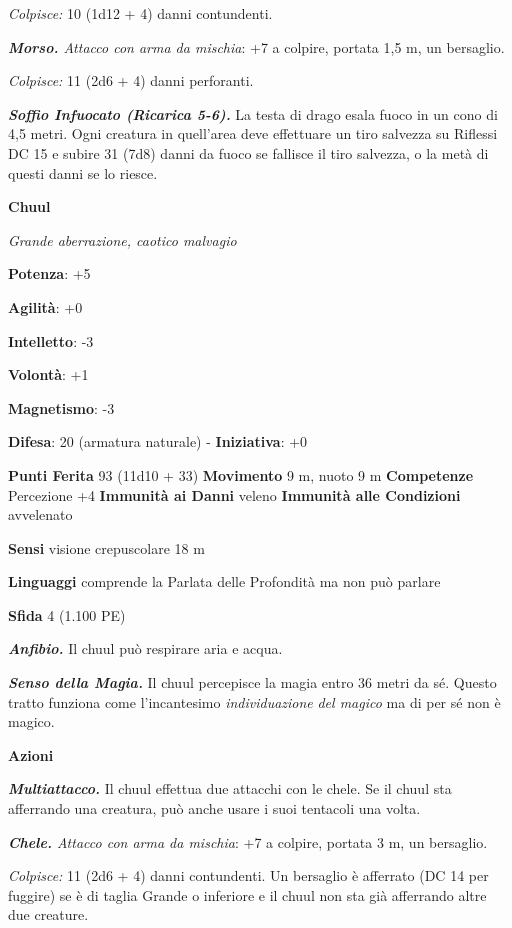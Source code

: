 \begin{multicols}{2}
\emph{Colpisce:} 10 (1d12 + 4) danni contundenti.

\emph{\textbf{Morso.} Attacco con arma da mischia}: +7 a colpire,
portata 1,5 m, un bersaglio.

\emph{Colpisce:} 11 (2d6 + 4) danni perforanti.

\emph{\textbf{Soffio Infuocato (Ricarica 5-6).}} La testa di drago esala
fuoco in un cono di 4,5 metri. Ogni creatura in quell'area deve
effettuare un tiro salvezza su Riflessi DC 15 e subire 31 (7d8) danni
da fuoco se fallisce il tiro salvezza, o la metà di questi danni se lo
riesce.

\textbf{Chuul}

\emph{Grande aberrazione, caotico malvagio}

\textbf{Potenza}: +5

\textbf{Agilità}: +0

\textbf{Intelletto}: -3

\textbf{Volontà}: +1

\textbf{Magnetismo}: -3

\textbf{Difesa}: 20 (armatura naturale) - \textbf{Iniziativa}: +0

\textbf{Punti Ferita} 93 (11d10 + 33) \textbf{Movimento} 9 m, nuoto 9 m
\textbf{Competenze} Percezione +4 \textbf{Immunità ai Danni} veleno
\textbf{Immunità alle Condizioni} avvelenato

\textbf{Sensi} visione crepuscolare 18 m

\textbf{Linguaggi} comprende la Parlata delle Profondità ma non può
parlare

\textbf{Sfida} 4 (1.100 PE)

\emph{\textbf{Anfibio.}} Il chuul può respirare aria e acqua.

\emph{\textbf{Senso della Magia.}} Il chuul percepisce la magia entro 36
metri da sé. Questo tratto funziona come l'incantesimo
\emph{individuazione} \emph{del magico} ma di per sé non è magico.

\textbf{Azioni}

\emph{\textbf{Multiattacco.}} Il chuul effettua due attacchi con le
chele. Se il chuul sta afferrando una creatura, può anche usare i suoi
tentacoli una volta.

\emph{\textbf{Chele.} Attacco con arma da mischia}: +7 a colpire,
portata 3 m, un bersaglio.

\emph{Colpisce:} 11 (2d6 + 4) danni contundenti. Un bersaglio è
afferrato (DC 14 per fuggire) se è di taglia Grande o inferiore e il
chuul non sta già afferrando altre due creature.


\end{multicols}
